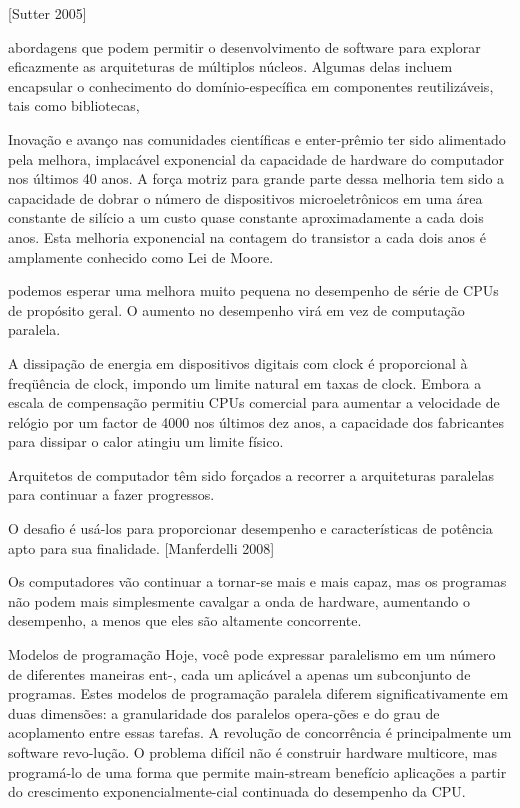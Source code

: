  [Sutter 2005]
 
 
 
 
 abordagens que podem permitir o desenvolvimento de software para explorar eficazmente as arquiteturas de múltiplos núcleos. Algumas delas incluem encapsular o conhecimento do domínio-específica em componentes reutilizáveis, tais como bibliotecas,

Inovação e avanço nas comunidades científicas e enter-prêmio ter sido alimentado pela melhora, implacável exponencial da capacidade de hardware do computador nos últimos 40 anos. A força motriz para grande parte dessa melhoria tem sido a capacidade de dobrar o número de dispositivos microeletrônicos em uma área constante de silício a um custo quase constante aproximadamente a cada dois anos. Esta melhoria exponencial na contagem do transistor a cada dois anos é amplamente conhecido como Lei de Moore.

podemos esperar uma melhora muito pequena no desempenho de série de CPUs de propósito geral. O aumento no desempenho virá em vez de computação paralela.

A dissipação de energia em dispositivos digitais com clock é proporcional à freqüência de clock, impondo um limite natural em taxas de clock. Embora a escala de compensação permitiu CPUs comercial para aumentar a velocidade de relógio por um factor de 4000 nos últimos dez anos, a capacidade dos fabricantes para dissipar o calor atingiu um limite físico.

 Arquitetos de computador têm sido forçados a recorrer a arquiteturas paralelas para continuar a fazer progressos.
 
 O desafio é usá-los para proporcionar desempenho e características de potência apto para sua finalidade.
 [Manferdelli 2008]
 
 
Os computadores vão continuar a tornar-se mais e mais capaz, mas os programas não podem mais simplesmente cavalgar a onda de hardware, aumentando o desempenho, a menos que eles são altamente concorrente.
 
 Modelos de programação
Hoje, você pode expressar paralelismo em um número de diferentes maneiras ent-, cada um aplicável a apenas um subconjunto de programas.
Estes modelos de programação paralela diferem significativamente em duas dimensões: a granularidade dos paralelos opera-ções e do grau de acoplamento entre essas tarefas.
 A revolução de concorrência é principalmente um software revo-lução. O problema difícil não é construir hardware multicore, mas programá-lo de uma forma que permite main-stream benefício aplicações a partir do crescimento exponencialmente-cial continuada do desempenho da CPU.
 
